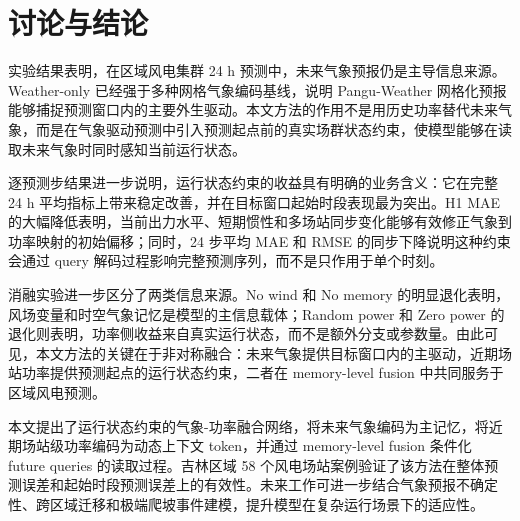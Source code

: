\section{讨论与结论}

实验结果表明，在区域风电集群 24 h 预测中，未来气象预报仍是主导信息来源。Weather-only 已经强于多种网格气象编码基线，说明 Pangu-Weather 网格化预报能够捕捉预测窗口内的主要外生驱动。本文方法的作用不是用历史功率替代未来气象，而是在气象驱动预测中引入预测起点前的真实场群状态约束，使模型能够在读取未来气象时同时感知当前运行状态。

逐预测步结果进一步说明，运行状态约束的收益具有明确的业务含义：它在完整 24 h 平均指标上带来稳定改善，并在目标窗口起始时段表现最为突出。H1 MAE 的大幅降低表明，当前出力水平、短期惯性和多场站同步变化能够有效修正气象到功率映射的初始偏移；同时，24 步平均 MAE 和 RMSE 的同步下降说明这种约束会通过 query 解码过程影响完整预测序列，而不是只作用于单个时刻。

消融实验进一步区分了两类信息来源。No wind 和 No memory 的明显退化表明，风场变量和时空气象记忆是模型的主信息载体；Random power 和 Zero power 的退化则表明，功率侧收益来自真实运行状态，而不是额外分支或参数量。由此可见，本文方法的关键在于非对称融合：未来气象提供目标窗口内的主驱动，近期场站功率提供预测起点的运行状态约束，二者在 memory-level fusion 中共同服务于区域风电预测。

本文提出了运行状态约束的气象-功率融合网络，将未来气象编码为主记忆，将近期场站级功率编码为动态上下文 token，并通过 memory-level fusion 条件化 future queries 的读取过程。吉林区域 58 个风电场站案例验证了该方法在整体预测误差和起始时段预测误差上的有效性。未来工作可进一步结合气象预报不确定性、跨区域迁移和极端爬坡事件建模，提升模型在复杂运行场景下的适应性。
